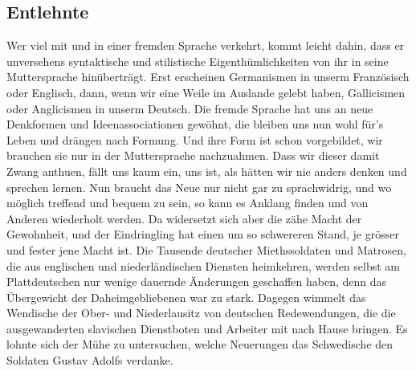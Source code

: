 {\subsection*{Entlehnte }
Wer viel mit und in einer fremden Sprache verkehrt, kommt leicht dahin, dass er unversehens syntaktische und stilistische Eigenthümlichkeiten von ihr in seine Muttersprache hinüberträgt. Erst erscheinen Germanismen in unserm Französisch oder Englisch, dann, wenn wir eine Weile im Auslande gelebt haben, Gallicismen oder Anglicismen in unserm Deutsch. Die fremde Sprache hat uns an neue Denkformen und Ideenassociationen gewöhnt, die bleiben uns nun wohl für’s Leben und drängen nach Formung. Und ihre Form ist schon vorgebildet, wir brauchen sie nur in der Muttersprache nachzuahmen. Dass wir dieser damit Zwang anthuen, fällt uns kaum ein, uns ist, als hätten wir nie anders denken und sprechen lernen. Nun braucht das Neue nur nicht gar zu sprachwidrig, und wo möglich treffend und bequem zu sein, so kann es Anklang finden und von Anderen wiederholt werden. Da widersetzt sich aber die zähe Macht der Gewohnheit, und der Eindringling hat einen um so schwereren Stand, je grösser und fester jene Macht ist. Die Tausende deutscher Miethssoldaten und Matrosen, die aus englischen und niederländischen Diensten heimkehren, werden selbst am Plattdeutschen nur wenige dauernde Änderungen geschaffen haben, denn das Übergewicht der Daheimgebliebenen war zu stark. Dagegen wimmelt das Wendische der Ober- und Niederlausitz von deutschen Redewendungen, die die ausgewanderten slavischen Dienstboten und Arbeiter mit nach Hause bringen. Es \label{sp.271} lohnte sich der Mühe zu untersuchen, welche Neuerungen das Schwedische den Soldaten Gustav Adolfs verdanke.

}
